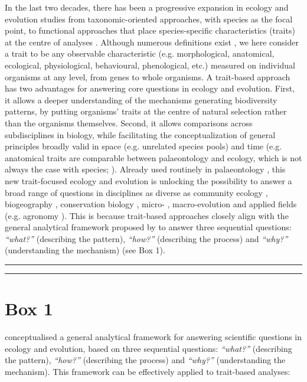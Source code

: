 \documentclass[12pt,letterpaper]{article}
\begin{document}
In the last two decades, there has been a progressive expansion in ecology and evolution studies from taxonomic-oriented approaches, with species as the focal point, to functional approaches that place species-specific characteristics (traits) at the centre of analyses \citep{mammola2021concepts, palacio2022protocol}. Although numerous definitions exist \citep{dawson2021traits}, we here consider a trait to be any observable characteristic (e.g. morphological, anatomical, ecological, physiological, behavioural, phenological, etc.) measured on individual organisms at any level, from genes to whole organisms.
A trait-based approach has two advantages for answering core questions in ecology and evolution.
First, it allows a deeper understanding of the mechanisms generating biodiversity patterns, by putting organisms' traits at the centre of natural selection rather than the organisms themselves.
Second, it allows comparisons across subdisciplines in biology, while facilitating the conceptualization of general principles broadly valid in space (e.g. unrelated species pools) and time (e.g. anatomical traits are comparable between palaeontology and ecology, which is not always the case with species; \citealt{luza2023going}).
Already used routinely in palaeontology \citep{raup1961geometry, gould1991disparity, foote1995morphological, guillerme2020disparities}, this new trait-focused ecology and evolution is unlocking the possibility to answer a broad range of questions in disciplines as diverse as community ecology \citep{mcgill2006rebuilding}, biogeography \citep{violle2014emergence}, conservation biology \citep{chichorro2022trait}, micro- \citep{chapin1993evolution}, macro-evolution \citep{guillerme2023innovation} and applied fields (e.g. agronomy \citealt{martin2015plant}).
This is because trait-based approaches closely align with the general analytical framework proposed by \cite{anand1994pattern} to answer three sequential questions: \textit{``what?''} (describing the pattern), \textit{``how?''} (describing the process) and \textit{``why?''} (understanding the mechanism) (see Box 1).

\bigskip
\bigskip
\hrule
\hrule

\section*{Box 1}
\cite{anand1994pattern} conceptualised a general analytical framework for answering scientific questions in ecology and evolution, based on three sequential questions: \textit{``what?''} (describing the pattern), \textit{``how?''} (describing the process) and \textit{``why?''} (understanding the mechanism).
This framework can be effectively applied to trait-based analyses:
\end{document}
